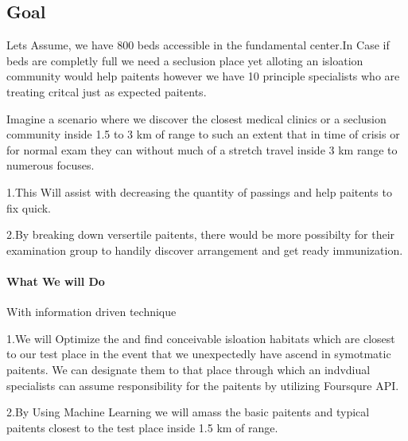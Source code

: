\documentclass[11pt]{article}
\begin{document}
    \subsection{Goal}\label{goal}

    Lets Assume, we have 800 beds accessible in the fundamental center.In
Case if beds are completly full we need a seclusion place yet alloting
an isloation community would help paitents however we have 10 principle
specialists who are treating critcal just as expected paitents.

Imagine a scenario where we discover the closest medical clinics or a
seclusion community inside 1.5 to 3 km of range to such an extent that
in time of crisis or for normal exam they can without much of a stretch
travel inside 3 km range to numerous focuses.

1.This Will assist with decreasing the quantity of passings and help
paitents to fix quick.

2.By breaking down versertile paitents, there would be more possibilty
for their examination group to handily discover arrangement and get
ready immunization.

\paragraph{What We will Do}\label{what-we-will-do}

With information driven technique

1.We will Optimize the and find conceivable isloation habitats which are
closest to our test place in the event that we unexpectedly have ascend
in symotmatic paitents. We can designate them to that place through
which an indvdiual specialists can assume responsibility for the
paitents by utilizing Foursqure API.

2.By Using Machine Learning we will amass the basic paitents and typical
paitents closest to the test place inside 1.5 km of range.
\end{document}
